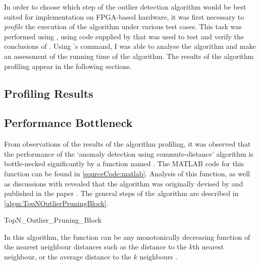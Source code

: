 In order to choose which step of the outlier detection algorithm would be best
suited for implementation on \gls{FPGA}-based hardware, it was first necessary
to \emph{profile} the execution of the algorithm under various test cases. This
task was performed using , using code supplied by
\citeauthor{Khoa:2012} that was used to test and verify the conclusions of
. Using 's  command, I
was able to analyse the algorithm and make an assessment of the running time of
the algorithm. The results of the algorithm profiling appear in the following
sections.

\subsection{Profiling Results}
\label{algorithmPerformance:bottleneck}

\subsection{Performance Bottleneck}
\label{algorithmPerformance:bottleneck}
From observations of the results of the algorithm profiling, it was observed
that the performance of the `anomaly detection using commute-distance' algorithm
is bottle-necked significantly by a function named
. The MATLAB code for this function can be
found in \autoref{sourceCode:matlab}. Analysis of this function, as well as
discussions with \citeauthor{Khoa:2012} revealed that the algorithm was
originally devised by \citeauthor{Bay:2003} and published in the paper
. The general steps of the algorithm are described in
\autoref{algm:TopNOutlierPruningBlock}.

\begin{algorithm}
    
    \caption{TopN\_Outlier\_Pruning\_Block}
    \label{algm:TopNOutlierPruningBlock}
\end{algorithm}

In this algorithm, the  function can be any monotonically
decreasing function of the nearest neighbour distances such as the distance to
the $k$th nearest neighbour, or the average distance to the $k$ neighbours
\cite{Bay:2003}.


